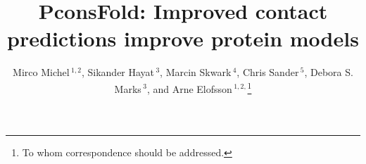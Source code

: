 \documentclass{bioinfo}
\begin{document}

\title[PconsFold]{PconsFold: Improved contact predictions improve
  protein models}
\author[M.Michel \textit{et~al}]{Mirco Michel\,$^{1,2}$, Sikander
  Hayat\,$^{3}$, Marcin Skwark\,$^{4}$, Chris Sander\,$^{5}$, Debora
  S. Marks\,$^{3}$,  and Arne Elofsson\,$^{1,2,}$\footnote{To whom correspondence should be addressed.}}
\address{$^{1}$Department of Biochemistry and Biophysics, Stockholm University, 10691 Stockholm, Sweden,
$^{2}$Science for Life Laboratory, Box 1031, 17121 Solna, Sweden,
$^{3}$Department of Systems Biology, Harvard Medical School, Boston, Massachusetts, USA,
$^{4}$Department of Information and Computer Science, Aalto University, PO Box 15400, FI-00076 Aalto, Finland, and
$^{5}$Computational Biology Center, Memorial Sloan-Kettering Cancer Center, New York, New York, USA}



\maketitle
\end{document}
